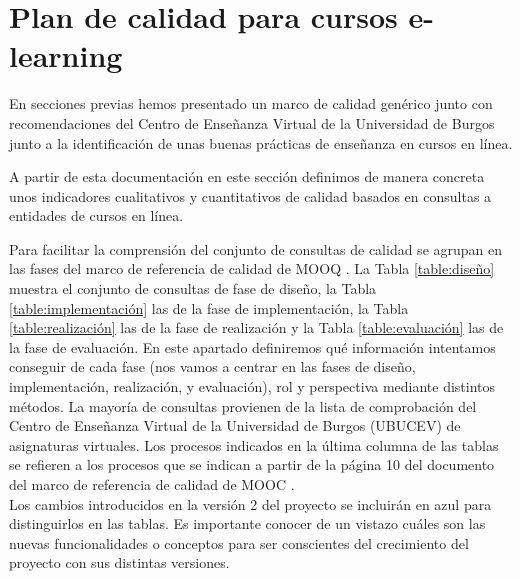 \section{Plan de calidad para cursos e-learning}
En secciones previas hemos presentado un marco de calidad genérico junto con recomendaciones del Centro de Enseñanza Virtual de la Universidad de Burgos junto a la identificación de unas buenas prácticas de enseñanza en cursos en línea.

A partir de esta documentación en este sección definimos de manera concreta unos indicadores cualitativos y cuantitativos de calidad basados en consultas a entidades de cursos en línea.

Para facilitar la comprensión del conjunto de consultas de calidad se agrupan en las fases del marco de referencia de calidad de MOOQ \cite{stracke2018quality}. La Tabla \ref{table:diseño} muestra el  conjunto  de consultas de  fase de diseño, la Tabla \ref{table:implementación} las de la fase de implementación, la Tabla \ref{table:realización} las de la fase de realización y la Tabla \ref{table:evaluación} las de la fase de evaluación.
En este apartado definiremos qué información intentamos conseguir de cada fase (nos vamos a centrar en las fases de diseño, implementación, realización, y evaluación), rol y perspectiva mediante distintos métodos. La mayoría de consultas provienen de la lista de comprobación del Centro de Enseñanza Virtual de la Universidad de Burgos (UBUCEV) de asignaturas virtuales.
Los procesos indicados en la última columna de las tablas se refieren a los procesos que se indican a partir de la página 10 del documento del marco de referencia de calidad de MOOC \cite{stracke2018quality}. \\
Los cambios introducidos en la versión 2 del proyecto se incluirán en azul para distinguirlos en las tablas. Es importante conocer de un vistazo cuáles son las nuevas funcionalidades o conceptos para ser conscientes del crecimiento del proyecto con sus distintas versiones.\\

